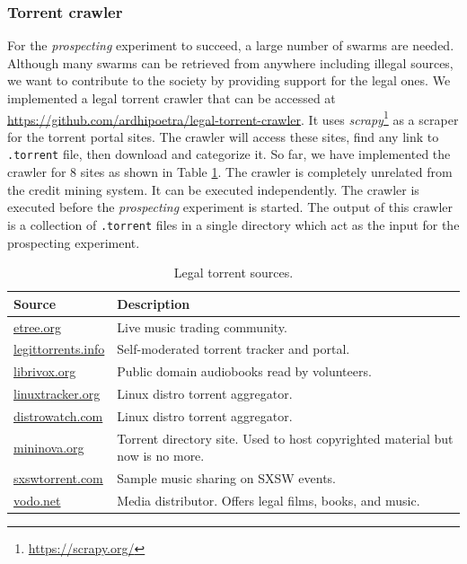 \subsubsection{Torrent crawler}
For the \textit{prospecting} experiment to succeed, a large number of swarms are needed. Although many swarms can be retrieved from anywhere including illegal sources, we want to contribute to the society by providing support for the legal ones. We implemented a legal torrent crawler that can be accessed at \url{https://github.com/ardhipoetra/legal-torrent-crawler}. It uses \textit{scrapy}\footnote{\url{https://scrapy.org/}} as a scraper for the torrent portal sites. The crawler will access these sites, find any link to \texttt{.torrent} file, then download and categorize it. So far, we have implemented the crawler for 8 sites as shown in Table \ref{tbl:legaltorrentsource}. The crawler is completely unrelated from the credit mining system. It can be executed independently. The crawler is executed before the \textit{prospecting} experiment is started. The output of this crawler is a collection of \texttt{.torrent} files in a single directory which act as the input for the prospecting experiment.

\begin{table}[h]
	\centering
	\caption{Legal torrent sources.}
	\label{tbl:legaltorrentsource}
	\begin{tabular}{lp{8.5cm}}
		\hline
		Source & Description \\ \hline
		\url{etree.org} & Live music trading community. \\
		\url{legittorrents.info} & Self-moderated torrent tracker and portal. \\
		\url{librivox.org} & Public domain audiobooks read by volunteers. \\
		\url{linuxtracker.org} & Linux distro torrent aggregator. \\
		\url{distrowatch.com} & Linux distro torrent aggregator. \\
		\url{mininova.org} & Torrent directory site. Used to host copyrighted material but now is no more.\\
		\url{sxswtorrent.com} & Sample music sharing on SXSW events. \\
		\url{vodo.net} & Media distributor. Offers legal films, books, and music.
	\end{tabular}
\end{table}

%
